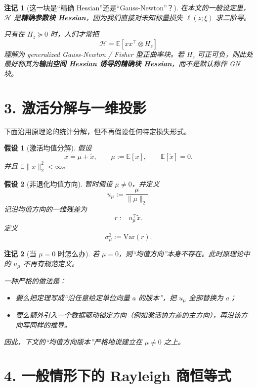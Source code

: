 \documentclass[11pt]{ctexart}
\newtheorem{remark}{注记}
\newtheorem{assumption}{假设}
\begin{document}
\begin{remark}[这一块是“精确 Hessian”还是“Gauss-Newton”？]
在本文的一般设定里，$\mathcal{H}$ 是\textbf{精确参数块 Hessian}，因为我们直接对未知标量损失 $\ell(z;\xi)$ 求二阶导。

只有在 $H_z \succeq 0$ 时，人们才常把
\[
\mathcal{H} = \mathbb{E}[xx^\top \otimes H_z]
\]
理解为 generalized Gauss-Newton / Fisher 型正曲率块。若 $H_z$ 可正可负，则此处最好称其为\textbf{输出空间 Hessian 诱导的精确块 Hessian}，而不是默认称作 GN 块。
\end{remark}

\section*{3. 激活分解与一维投影}

下面沿用原理论的统计分解，但不再假设任何特定损失形式。

\begin{assumption}[激活均值分解]\label{ass:mean_decomp}
假设
\[
x = \mu + \tilde{x}, \qquad \mu := \mathbb{E}[x], \qquad \mathbb{E}[\tilde{x}] = 0.
\]
并且 $\mathbb{E}\|x\|_2^2 < \infty$。
\end{assumption}

\begin{assumption}[非退化均值方向]\label{ass:mu_nonzero}
暂时假设 $\mu \neq 0$，并定义
\[
u_\mu := \frac{\mu}{\|\mu\|_2}.
\]
记沿均值方向的一维残差为
\[
r := u_\mu^\top \tilde{x}.
\]
定义
\[
\sigma_\mu^2 := \mathrm{Var}(r).
\]
\end{assumption}

\begin{remark}[当 $\mu = 0$ 时怎么办]
若 $\mu = 0$，则“均值方向”本身不存在。此时原理论中的 $u_\mu$ 不再有规范定义。

一种严格的做法是：
\begin{itemize}
    \item 要么把定理写成“沿任意给定单位向量 $a$ 的版本”，把 $u_\mu$ 全部替换为 $a$；
    \item 要么额外引入一个数据驱动锚定方向（例如激活协方差的主方向），再沿该方向写同样的推导。
\end{itemize}

因此，下文的“均值方向版本”严格地说建立在 $\mu \neq 0$ 之上。
\end{remark}

\section*{4. 一般情形下的 Rayleigh 商恒等式}
\end{document}
